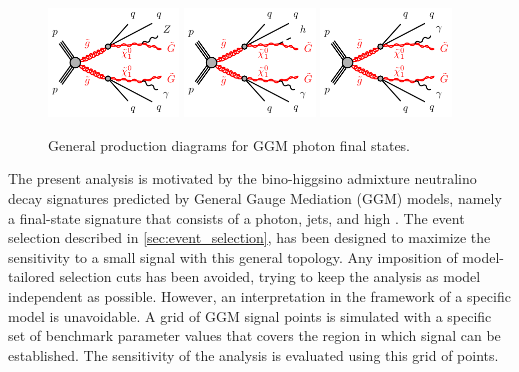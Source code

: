 
\begin{figure}[h!]
  \centering
  \includegraphics[width=0.31\textwidth]{figures/gogo-qqqqphZGG-GMSB}
  \includegraphics[width=0.31\textwidth]{figures/gogo-qqqqhphGG-GMSB}
  \includegraphics[width=0.31\textwidth]{figures/gogo-qqqqphphGG-GMSB}
  \caption{General production diagrams for GGM photon final states.}
  \label{fig:GGM_diagrams}
\end{figure}


The present analysis is motivated by the bino-higgsino admixture neutralino decay signatures predicted by General Gauge Mediation (GGM) models,
namely a final-state signature that consists of a photon, jets, and high \MET. The event selection described in \Sec \ref{sec:event_selection},
has been designed to maximize the sensitivity to a small signal with this general topology. Any imposition of model-tailored selection cuts has been
avoided, trying to keep the analysis as model independent as possible. However, an interpretation in the framework of a specific model is unavoidable.
A grid of GGM signal points is simulated with a specific set of benchmark parameter values that covers the region in which signal can be established.
The sensitivity of the analysis is evaluated using this grid of points.


